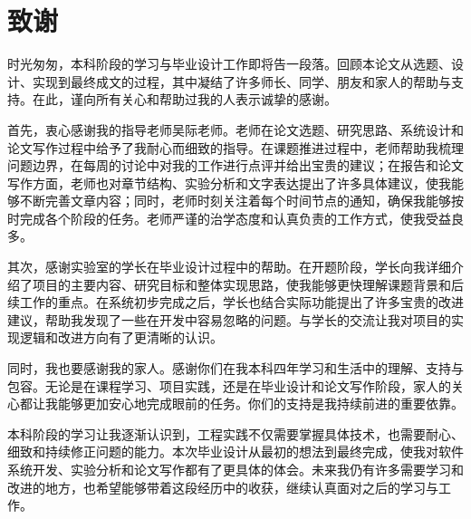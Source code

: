 \chapter*{致谢}

时光匆匆，本科阶段的学习与毕业设计工作即将告一段落。回顾本论文从选题、设计、实现到最终成文的过程，其中凝结了许多师长、同学、朋友和家人的帮助与支持。在此，谨向所有关心和帮助过我的人表示诚挚的感谢。

首先，衷心感谢我的指导老师吴际老师。老师在论文选题、研究思路、系统设计和论文写作过程中给予了我耐心而细致的指导。在课题推进过程中，老师帮助我梳理问题边界，在每周的讨论中对我的工作进行点评并给出宝贵的建议；在报告和论文写作方面，老师也对章节结构、实验分析和文字表达提出了许多具体建议，使我能够不断完善文章内容；同时，老师时刻关注着每个时间节点的通知，确保我能够按时完成各个阶段的任务。老师严谨的治学态度和认真负责的工作方式，使我受益良多。

其次，感谢实验室的学长在毕业设计过程中的帮助。在开题阶段，学长向我详细介绍了项目的主要内容、研究目标和整体实现思路，使我能够更快理解课题背景和后续工作的重点。在系统初步完成之后，学长也结合实际功能提出了许多宝贵的改进建议，帮助我发现了一些在开发中容易忽略的问题。与学长的交流让我对项目的实现逻辑和改进方向有了更清晰的认识。

同时，我也要感谢我的家人。感谢你们在我本科四年学习和生活中的理解、支持与包容。无论是在课程学习、项目实践，还是在毕业设计和论文写作阶段，家人的关心都让我能够更加安心地完成眼前的任务。你们的支持是我持续前进的重要依靠。

本科阶段的学习让我逐渐认识到，工程实践不仅需要掌握具体技术，也需要耐心、细致和持续修正问题的能力。本次毕业设计从最初的想法到最终完成，使我对软件系统开发、实验分析和论文写作都有了更具体的体会。未来我仍有许多需要学习和改进的地方，也希望能够带着这段经历中的收获，继续认真面对之后的学习与工作。

\cleardoublepage